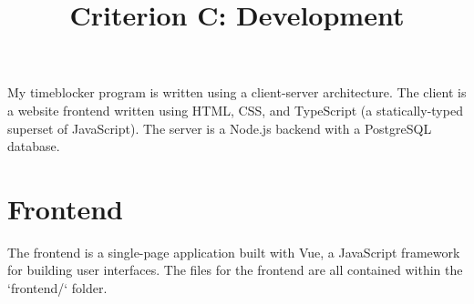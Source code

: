 \documentclass[notitlepage, 12pt]{report}
\title{Criterion C: Development}
\author{} %
\begin{document}
\maketitle

My timeblocker program is written using a client-server architecture. The client is a website frontend written using HTML, CSS, and TypeScript (a statically-typed superset of JavaScript). The server is a Node.js backend with a PostgreSQL database.

\section*{Frontend}
The frontend is a single-page application built with Vue, a JavaScript framework for building user interfaces. The files for the frontend are all contained within the `frontend/` folder.
\end{document}
